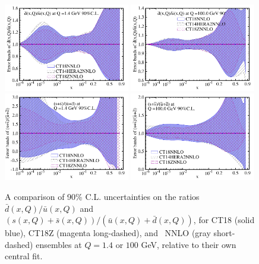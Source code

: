 \begin{figure}[tb]
	\center
	\includegraphics[width=0.49\textwidth]{./fig/dbub_1p4_CT18_err.pdf}
	\includegraphics[width=0.49\textwidth]{./fig/dbub_100_CT18_err.pdf}
	\includegraphics[width=0.49\textwidth]{./fig/Rs_1p4_CT18_err.pdf} 
	\includegraphics[width=0.49\textwidth]{./fig/Rs_100_CT18_err.pdf} 
	\caption{A comparison of 90\% C.L. uncertainties on the ratios
		$\bar d(x,Q)/\bar u(x,Q)$ and $\left(s(x,Q)+\bar
		s(x,Q)\right)/\left(\bar u(x,Q) +\bar d(x,Q)\right)$,
	for CT18 (solid
		blue), CT18Z (magenta long-dashed), and \CTHERAII~NNLO (gray short-dashed) ensembles
		at $Q=1.4$ or $100$ GeV, relative to 
		their own central fit.  
		\label{fig:DBandSBbands2}}
\end{figure}

